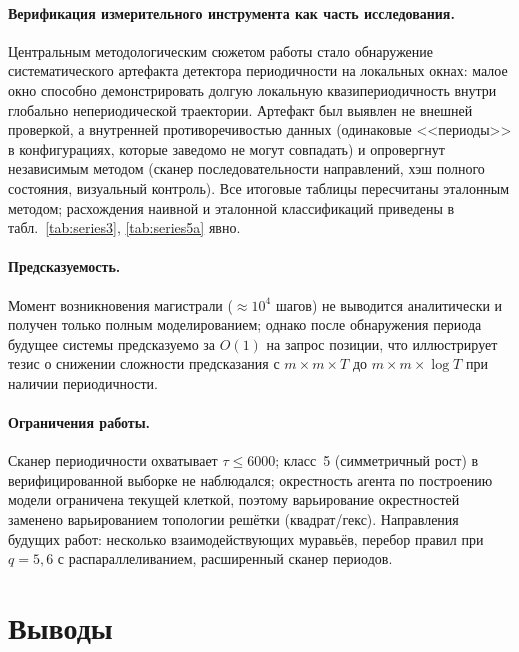 \documentclass[12pt,a4paper]{article}
\begin{document}
	\paragraph{Верификация измерительного инструмента как часть исследования.}
	Центральным методологическим сюжетом работы стало обнаружение систематического артефакта детектора периодичности на локальных окнах: малое окно способно демонстрировать долгую локальную квазипериодичность внутри глобально непериодической траектории. Артефакт был выявлен не внешней проверкой, а внутренней противоречивостью данных (одинаковые <<периоды>> в конфигурациях, которые заведомо не могут совпадать) и опровергнут независимым методом (сканер последовательности направлений, хэш полного состояния, визуальный контроль). Все итоговые таблицы пересчитаны эталонным методом; расхождения наивной и эталонной классификаций приведены в табл.~\ref{tab:series3},
	\ref{tab:series5a} явно.
	
	\paragraph{Предсказуемость.}
	Момент возникновения магистрали ($\approx10^4$ шагов) не выводится аналитически и получен только полным моделированием; однако после обнаружения периода будущее системы предсказуемо за $O(1)$ на запрос позиции, что иллюстрирует тезис о снижении сложности предсказания с $m\times m\times T$ до $m\times m\times\log T$ при наличии периодичности.
	
	\paragraph{Ограничения работы.} 
	Сканер периодичности охватывает $\tau\le6000$; класс~5 (симметричный рост) в верифицированной выборке не наблюдался; окрестность агента по построению модели ограничена текущей клеткой, поэтому варьирование окрестностей заменено варьированием топологии решётки (квадрат/гекс). Направления будущих работ: несколько взаимодействующих муравьёв, перебор правил при $q=5,6$ с распараллеливанием, расширенный сканер периодов.
	
	\section{Выводы}
	
\end{document}

